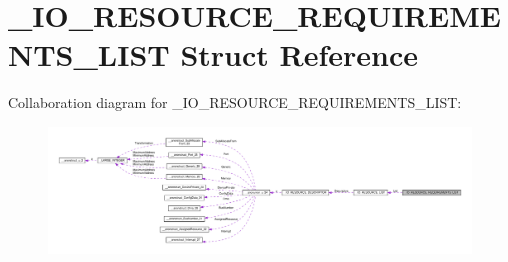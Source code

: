 \hypertarget{struct__IO__RESOURCE__REQUIREMENTS__LIST}{}\section{\+\_\+\+I\+O\+\_\+\+R\+E\+S\+O\+U\+R\+C\+E\+\_\+\+R\+E\+Q\+U\+I\+R\+E\+M\+E\+N\+T\+S\+\_\+\+L\+I\+S\+T Struct Reference}
\label{struct__IO__RESOURCE__REQUIREMENTS__LIST}


Collaboration diagram for \+\_\+\+I\+O\+\_\+\+R\+E\+S\+O\+U\+R\+C\+E\+\_\+\+R\+E\+Q\+U\+I\+R\+E\+M\+E\+N\+T\+S\+\_\+\+L\+I\+S\+T\+:
\nopagebreak
\begin{figure}[H]
\begin{center}
\leavevmode
\includegraphics[width=350pt]{struct__IO__RESOURCE__REQUIREMENTS__LIST__coll__graph}
\end{center}
\end{figure}
